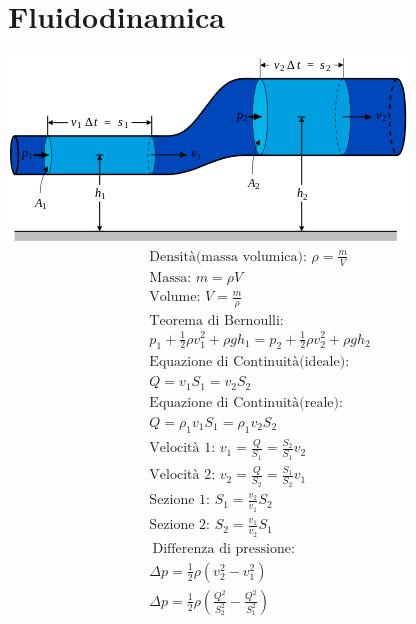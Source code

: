 \section{Fluidodinamica}

\includegraphics[width=1 \linewidth]{FluidoDinamica/flusso.png} \\

\begin{gather*}
    \text{Densità(massa volumica): } \rho = \frac{m}{V} \\
    \text{Massa: } m = \rho V \\
    \text{Volume: } V = \frac{m}{\rho} \\
    \text{Teorema di Bernoulli: } \\ p_1 + \frac{1}{2} \rho v_1^2 + \rho g h_1 = p_2 + \frac{1}{2} \rho v_2^2 + \rho g h_2 \\
    \text{Equazione di Continuità(ideale): } \\  Q = v_1 S_1 = v_2 S_2 \\
    \text{Equazione di Continuità(reale): } \\ Q = \rho_1 v_1 S_1 = \rho_1 v_2 S_2 \\
    \text{Velocità 1: } v_1 = \frac{Q}{S_1} = \frac{S_2}{S_1} v_2 \\
    \text{Velocità 2: } v_2 = \frac{Q}{S_2} = \frac{S_1}{S_2} v_1 \\
    \text{Sezione 1: } S_1 = \frac{v_2}{v_1} S_2 \\
    \text{Sezione 2: } S_2 = \frac{v_1}{v_2} S_1 \\\
    \text{Differenza di pressione: } \\
    \Delta p = \frac{1}{2} \rho (v_2^2 - v_1^2) \\ 
    \Delta p = \frac{1}{2} \rho (\frac{Q^2}{S_2^2} - \frac{Q^2}{S_1^2})
\end{gather*}